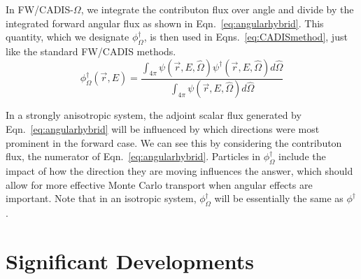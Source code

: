 \documentclass[12pt]{article}
\begin{document}
In FW/CADIS-$\Omega$, we integrate the contributon flux over angle and divide by the integrated forward angular flux as shown in Eqn.~\eqref{eq:angularhybrid}.
This quantity, which we designate $\phi^{\dagger}_{\Omega}$, is then used in Eqns.~\eqref{eq:CADISmethod}, just like the standard FW/CADIS methods.
%
\begin{equation} 
\phi^{\dagger}_{\Omega}(\vec{r},E) = \frac{\int_{4\pi} \psi(\vec {r} ,E,\hat{\Omega})\psi^{\dagger}(\vec {r} ,E,\hat{\Omega})d\hat\Omega }{\int_{4\pi}\psi(\vec {r} ,E,\hat{\Omega})d\hat\Omega}
\label{eq:angularhybrid}
\end{equation}

In a strongly anisotropic system, the adjoint scalar flux generated by Eqn.~\eqref{eq:angularhybrid} will be influenced by which directions were most prominent in the forward case. 
We can see this by considering the contributon flux, the numerator of Eqn.~\eqref{eq:angularhybrid}.
Particles in $\phi^{\dagger}_{\Omega}$ include the impact of how the direction they are moving influences the answer, 
which should allow for more effective Monte Carlo transport when angular effects are important. 
Note that in an isotropic system, $\phi^{\dagger}_{\Omega}$ will be essentially the same as $\phi^{\dagger}$. 


\section{Significant Developments}
\label{sect::sig-devel}
\end{document}
